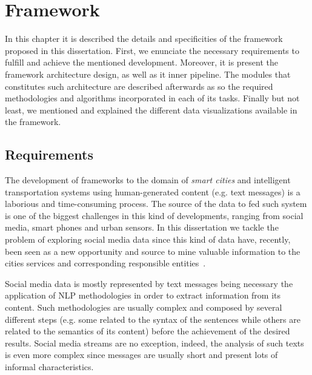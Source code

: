 \chapter{Framework}
\label{chap:framework}

\minitoc \mtcskip \noindent

In this chapter it is described the details and specificities of the framework proposed in this dissertation. First, we enunciate the necessary requirements to fulfill and achieve the mentioned development. Moreover, it is present the framework architecture design, as well as it inner pipeline. The modules that constitutes such architecture are described afterwards as so the required methodologies and algorithms incorporated in each of its tasks. Finally but not least, we mentioned and explained the different data visualizations available in the framework.

\section{Requirements}\label{sec:requirements}

The development of frameworks to the domain of \textit{smart cities} and intelligent transportation systems using human-generated content (e.g. text messages) is a laborious and time-consuming process. The source of the data to fed such system is one of the biggest challenges in this kind of developments, ranging from social media, smart phones and urban sensors. In this dissertation we tackle the problem of exploring social media data since this kind of data have, recently, been seen as a new opportunity and source to mine valuable information to the cities services and corresponding responsible entities~\cite{musto2015crowdpulse}.

Social media data is mostly represented by text messages being necessary the application of \gls{NLP} methodologies in order to extract information from its content. Such methodologies are usually complex and composed by several different steps (e.g. some related to the syntax of the sentences while others are related to the semantics of its content) before the achievement of the desired results. Social media streams are no exception, indeed, the analysis of such texts is even more complex since messages are usually short and present lots of informal characteristics.

